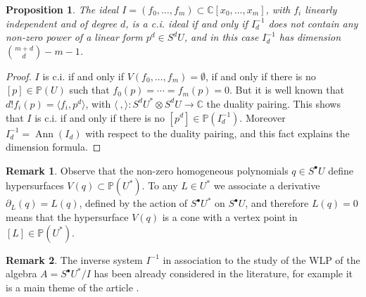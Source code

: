 \documentclass[10pt, a4paper]{amsart}
\theoremstyle{plain}
\newtheorem{prop}{Proposition}
\theoremstyle{definition}
\newtheorem{rmk}{Remark}
\theoremstyle{remark}
\def\C{\mathbb{C}}
\def\PP{\mathbb{P}}
\begin{document}
 \begin{prop}\label{prop:T} The ideal $I=(f_0,\ldots,f_m)\subset \C[x_0,\ldots,x_m]$, with $f_i$ linearly independent and of degree $d$, is a c.i. ideal if and only if $I^{-1}_d$ does not contain any non-zero power of a linear form $p^d\in S^dU$, and in this case $I^{-1}_d$ has dimension ${m+d\choose d}-m-1$. 
 \end{prop} 

 \begin{proof}  $I$ is c.i. if and only if $V(f_0,\ldots,f_m)=\emptyset$, if and only if there is no $[p]\in \PP(U)$ such that $f_0(p)=\cdots=f_m(p)=0$. But it is well known that $d!f_i(p)=\langle f_i,p^d\rangle$, with $\langle\ ,\rangle\colon S^dU^\ast\otimes S^dU\to \C$ the duality pairing. This shows that $I$ is c.i. if and only if there is no $[p^d]\in\PP(I_d^{-1})$.
Moreover $I_d^{-1}=\operatorname{Ann}(I_d)$ with respect to the duality pairing, and this fact explains the dimension formula. 
 \end{proof}

\begin{rmk}\label{rmk:vertexes} Observe that the non-zero homogeneous polynomials $q\in S^\bullet U$ define hypersurfaces  $V(q)\subset \PP(U^\ast)$.
 To any $L\in U^\ast$ we associate a derivative $\partial_L(q)=L(q)$, defined by the action of $S^\bullet U^\ast $ on $S^\bullet U$, and therefore
 $L(q)=0$ means that the hypersurface $V(q)$ is a cone with a vertex point in $[L]\in\PP(U^\ast)$. 
 \end{rmk}
 \begin{rmk} The inverse system $I^{-1}$ in association to the study of the WLP of the algebra $A=S^\bullet U^\ast/I$ has been already considered in the literature, for example it is a main theme of the article \cite{MOR}. 
\end{rmk}
\end{document}
